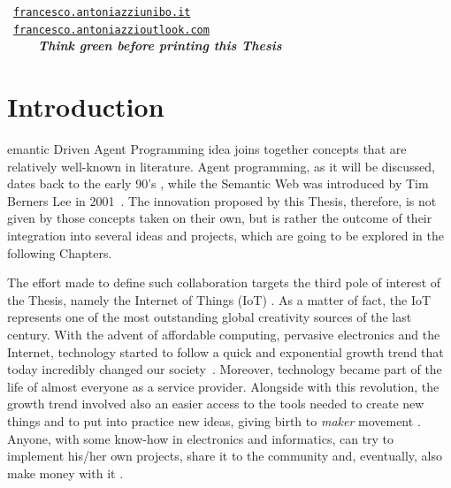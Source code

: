 \documentclass[11pt, twoside, openright]{report}   	%
\newcommand\blankpage{%
    \null
    \thispagestyle{empty}%
    \addtocounter{page}{-1}%
    \newpage}
\newcommand{\headletter}[1]{\lettrine[findent=2pt]{\fbox{\textbf{#1}}}{}}
\begin{document}


\blankpage
\thispagestyle{empty}
\vspace*{\fill}
\doclicenseThis
\vspace*{3cm}
\begin{center}
\faEnvelopeO~\href{mailto:francesco.antoniazzi@unibo.it}{\texttt{francesco.antoniazzi\faAt unibo.it}} \\
\faEnvelopeO~\href{mailto:francesco.antoniazzi@outlook.com}{\texttt{francesco.antoniazzi\faAt outlook.com}} \\
\vspace*{3cm}
\textcolor{red}{\faHeartbeat}~\textcolor{dkgreen}{\faGlobe~\faLeaf~~~\textbf{\textit{Think green before printing this Thesis}}}
\end{center}
\vspace*{\fill}

\tableofcontents
\clearpage



\chapter*{Introduction}
\headletter{S}
emantic Driven Agent Programming idea joins together concepts that are relatively well-known in literature. Agent programming, as it will be discussed, dates back to the early 90's \cite{shoham1993agent}, while the Semantic Web was introduced by Tim Berners Lee in 2001~\cite{berners2001semantic}. The innovation proposed by this Thesis, therefore, is not given by those concepts taken on their own, but is rather the outcome of their integration into several ideas and projects, which are going to be explored in the following Chapters. 

The effort made to define such collaboration targets the third pole of interest of the Thesis, namely the Internet of Things (IoT) \cite{ashton2009internet}. As a matter of fact, the IoT represents one of the most outstanding global creativity sources of the last century. With the advent of affordable computing, pervasive electronics and the Internet, technology started to follow a quick and exponential growth trend that today incredibly changed our society~\cite{gubbi2013internet}. Moreover, technology became part of the life of almost everyone as a service provider. Alongside with this revolution, the growth trend involved also an easier access to the tools needed to create new things and to put into practice new ideas, giving birth to \textit{maker} movement \cite{dougherty2012maker, martin2015promise}. Anyone, with some know-how in electronics and informatics, can try to implement his/her own projects, share it to the community and, eventually, also make money with it \cite{abbasy2017predictable, lensing2018designing}.
\end{document}

